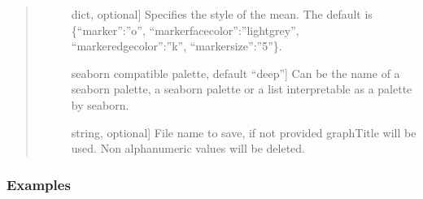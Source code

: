 \documentclass[letterpaper,10pt,english]{sphinxmanual}
\begin{document}
\begin{fulllineitems}
\begin{quote}
\begin{description}
\begin{description}
\item[{}] \leavevmode{[}dict, optional{]}
Specifies the style of the mean. 
The default is \{“marker”:”o”, 
“markerfacecolor”:”lightgrey”, 
“markeredgecolor”:”k”, “markersize”:”5”\}.

\item[{}] \leavevmode{[}seaborn compatible palette, default “deep”{]}
Can be the name of a seaborn palette, 
a seaborn palette or a list 
interpretable as a palette by seaborn.

\item[{}] \leavevmode{[}string, optional{]}
File name to save, if not provided graphTitle will be used. 
Non alphanumeric values will be deleted.

\end{description}

\end{description}\end{quote}
\subsubsection*{Examples}


\end{fulllineitems}
\end{document}
